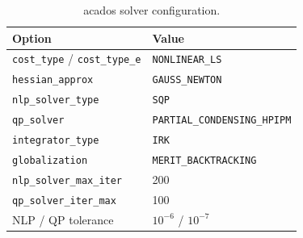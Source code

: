 \documentclass[11pt, a4paper]{article}
\begin{document}
\begin{table}[h]
  \centering
  \begin{tabular}{ll}
    \toprule
    Option & Value \\
    \midrule
    \texttt{cost\_type} / \texttt{cost\_type\_e} & \texttt{NONLINEAR\_LS} \\
    \texttt{hessian\_approx}                     & \texttt{GAUSS\_NEWTON} \\
    \texttt{nlp\_solver\_type}                   & \texttt{SQP} \\
    \texttt{qp\_solver}                          & \texttt{PARTIAL\_CONDENSING\_HPIPM} \\
    \texttt{integrator\_type}                    & \texttt{IRK} \\
    \texttt{globalization}                       & \texttt{MERIT\_BACKTRACKING} \\
    \texttt{nlp\_solver\_max\_iter}              & 200 \\
    \texttt{qp\_solver\_iter\_max}               & 100 \\
    NLP / QP tolerance                           & $10^{-6}$ / $10^{-7}$ \\
    \bottomrule
  \end{tabular}
  \caption{acados solver configuration.}
  \label{tab:acados}
\end{table}
\end{document}
